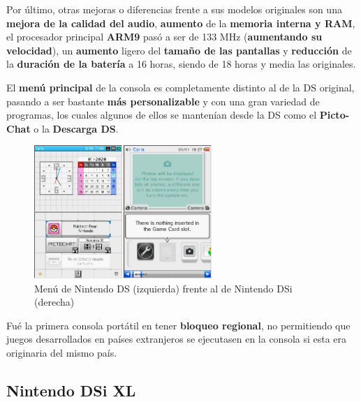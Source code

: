 \vspace{0.5cm}

Por último, otras mejoras o diferencias frente a sus modelos originales son una \textbf{mejora de la calidad del audio}, \textbf{aumento} de la \textbf{memoria interna y RAM}, el procesador principal \textbf{ARM9} pasó a ser de 133 MHz (\textbf{aumentando su velocidad}), un \textbf{aumento} ligero del \textbf{tamaño de las pantallas} y \textbf{reducción} de la \textbf{duración de la batería} a 16 horas, siendo de 18 horas y media las originales.

\vspace{0.5cm}

El \textbf{menú principal} de la consola es completamente distinto al de la DS original, pasando a ser bastante \textbf{más personalizable} y con una gran variedad de programas, los cuales algunos de ellos se mantenían desde la DS como el \textbf{Picto-Chat} o la \textbf{Descarga DS}.

\vspace{0.5cm}

\begin{figure}[htbp]
\centering
  \includegraphics[width=0.6\textwidth]{archivos/nds-ndsi-menu.png}
  \caption{Menú de Nintendo DS (izquierda) frente al de Nintendo DSi (derecha)}
  \label{fig:menu-comparacion} %
\end{figure}

\vspace{0.5cm}

Fué la primera consola portátil en tener \textbf{bloqueo regional}, no permitiendo que juegos desarrollados en países extranjeros se ejecutasen en la consola si esta era originaria del mismo país.

\vspace{1cm}

\subsection{Nintendo DSi XL}

